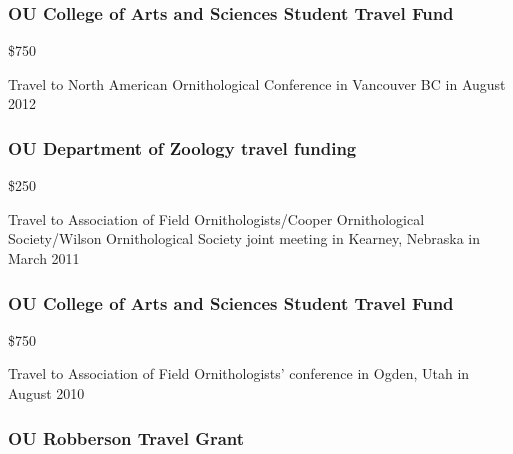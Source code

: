 \documentclass[
  letterpaper,
  DIV=11,
  numbers=noendperiod,
  oneside]{scrreprt}
\begin{document}
\subsubsection{OU College of Arts and Sciences Student Travel
Fund}\label{ou-college-of-arts-and-sciences-student-travel-fund-1}

\$750


Travel to North American Ornithological Conference in Vancouver BC in
August 2012

\subsubsection{OU Department of Zoology travel
funding}\label{ou-department-of-zoology-travel-funding}

\$250


Travel to Association of Field Ornithologists/Cooper Ornithological
Society/Wilson Ornithological Society joint meeting in Kearney, Nebraska
in March 2011

\subsubsection{OU College of Arts and Sciences Student Travel
Fund}\label{ou-college-of-arts-and-sciences-student-travel-fund-2}

\$750


Travel to Association of Field Ornithologists' conference in Ogden, Utah
in August 2010

\subsubsection{OU Robberson Travel
Grant}\label{ou-robberson-travel-grant}
\end{document}
